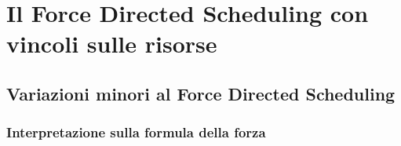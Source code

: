 \chapter{Il Force Directed Scheduling con vincoli sulle risorse}
\label{c:my:main}
\thispagestyle{empty}

\vspace{0.5cm}

\section{Variazioni minori al Force Directed Scheduling}
\label{c:my:var}

\subsection{Interpretazione sulla formula della forza}
\label{c:my:var:force}

